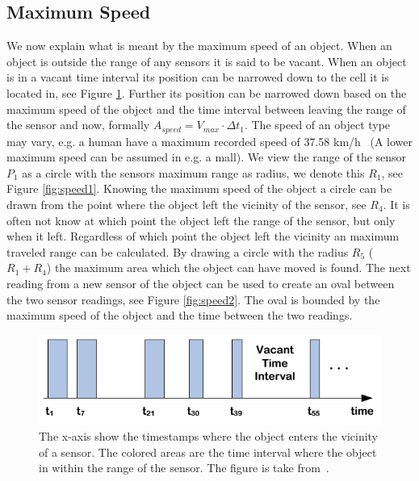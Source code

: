 \subsection{Maximum Speed}
\label{sec:speed}
We now explain what is meant by the maximum speed of an object.
When an object is outside the range of any sensors it is said to be vacant.
When an object is in a vacant time interval its position can be narrowed down to the cell it is located in, see Figure \ref{fig:vacant}. 
Further its position can be narrowed down based on the maximum speed of the object and the time interval between leaving the range of the sensor and now, formally $A_{speed}= V_{max}\cdot\Delta t_1$. 
The speed of an object type may vary, e.g. a human have a maximum recorded speed of 37.58 km/h~\cite{bolt} (A lower maximum speed can be assumed in e.g. a mall).
We view the range of the sensor $P_1$ as a circle with the sensors maximum range as radius, we denote this $R_1$, see Figure \ref{fig:speed1}.
Knowing the maximum speed of the object a circle can be drawn from the point where the object left the vicinity of the sensor, see $R_4$.
It is often not know at which point the object left the range of the sensor, but only when it left.
Regardless of which point the object left the vicinity an maximum traveled range can be calculated. 
By drawing a circle with the radius $R_5$ ($R_1 + R_4$) the maximum area which the object can have moved is found.  
The next reading from a new sensor of the object can be used to create an oval between the two sensor readings, see Figure \ref{fig:speed2}.  
The oval is bounded by the maximum speed of the object and the time between the two readings. 
\begin{figure}%
\centering
\includegraphics[width=\columnwidth]{images/vacant.png}%
\caption{The x-axis show the timestamps where the object enters the vicinity of a sensor. The colored areas are the time interval where the object in within the range of the sensor. The figure is take from~\cite{Jensen:2009:GMB:1590953.1591000}.}%
\label{fig:vacant}%
\end{figure}
